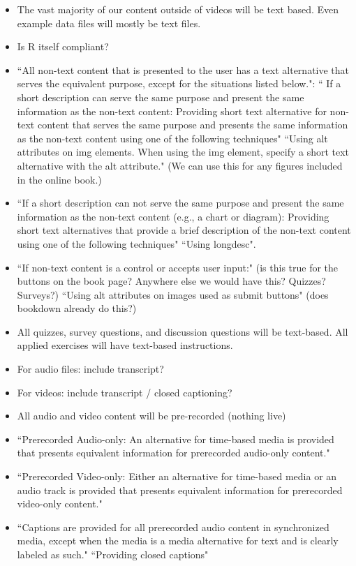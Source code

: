 \documentclass[pdftex,english,11pt,parskip=half]{scrartcl}
\begin{document}
\begin{itemize}
\item The vast majority of our content outside of videos will be text based. Even example data files will mostly be text files.
\item Is R itself compliant?
\item ``All non-text content that is presented to the user has a text alternative that serves the equivalent purpose, except for the situations listed below.": `` If a short description can serve the same purpose and present the same information as the non-text content: Providing short text alternative for non-text content that serves the same purpose and presents the same information as the non-text content using one of the following techniques" ``Using alt attributes on img elements. When using the img element, specify a short text alternative with the alt attribute." (We can use this for any figures included in the online book.)
\item ``If a short description can not serve the same purpose and present the same information as the non-text content (e.g., a chart or diagram): Providing short text alternatives that provide a brief description of the non-text content using one of the following techniques" ``Using longdesc".
\item ``If non-text content is a control or accepts user input:" (is this true for the buttons on the book page? Anywhere else we would have this? Quizzes? Surveys?) ``Using alt attributes on images used as submit buttons" (does bookdown already do this?)
\item All quizzes, survey questions, and discussion questions will be text-based. All applied exercises will have text-based instructions.
\item For audio files: include transcript?
\item For videos: include transcript / closed captioning?
\item All audio and video content will be pre-recorded (nothing live)
\item ``Prerecorded Audio-only: An alternative for time-based media is provided that presents equivalent information for prerecorded audio-only content."
\item ``Prerecorded Video-only: Either an alternative for time-based media or an audio track is provided that presents equivalent information for prerecorded video-only content."
\item ``Captions are provided for all prerecorded audio content in synchronized media, except when the media is a media alternative for text and is clearly labeled as such." ``Providing closed captions"

\end{itemize}
\end{document}
